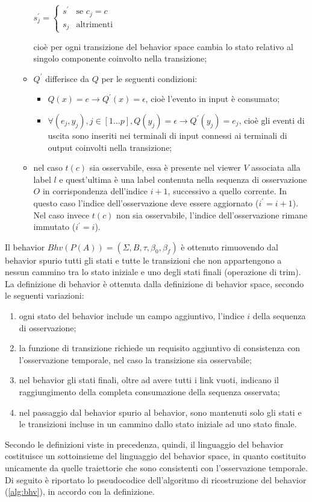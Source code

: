 \begin{defn}
\begin{enumerate}
\begin{itemize}
\begin{center}
$s^\prime_j = \begin{cases} s^\prime & \mbox{se }c_j = c\\ s_j & \mbox{altrimenti} \end{cases}$
\end{center}
cioè per ogni transizione del behavior space cambia lo stato relativo al singolo componente coinvolto nella transizione;
\item $Q^\prime$ differisce da $Q$ per le seguenti condizioni:
\begin{itemize}
\item $Q(x) = e \rightarrow Q^\prime(x) = \epsilon$, cioè l'evento in input è consumato;
\item $\forall(e_j,y_j), j \in [1 \ldots p], Q(y_j) = \epsilon \rightarrow Q^\prime(y_j) = e_j$, cioè gli eventi di uscita sono inseriti nei terminali di input connessi ai terminali di output coinvolti nella transizione; 
\end{itemize}
\item nel caso $t(c)$ sia osservabile, essa è presente nel viewer $V$ associata alla label $l$ e quest'ultima è una label contenuta nella sequenza di osservazione $O$ in corrispondenza dell'indice $i+1$, successivo a quello corrente. In questo caso l'indice dell'osservazione deve essere aggiornato ($i^\prime = i+1$). Nel caso invece $t(c)$ non sia osservabile, l'indice dell'osservazione rimane immutato ($i^\prime = i$).
\end{itemize}
\end{enumerate}

\end{defn}
Il behavior $Bhv(P(A)) = (\Sigma,B,\tau,\beta_0,\beta_f)$ è ottenuto rimuovendo dal behavior spurio tutti gli stati e tutte le transizioni che non appartengono a nessun cammino tra lo stato iniziale e uno degli stati finali (operazione di trim).
La definizione di behavior è ottenuta dalla definizione di behavior space, secondo le seguenti variazioni:
\begin{enumerate}
\item ogni stato del behavior include un campo aggiuntivo, l'indice $i$ della sequenza di osservazione;
\item la funzione di transizione richiede un requisito aggiuntivo di consistenza con l'osservazione temporale, nel caso la transizione sia osservabile;
\item nel behavior gli stati finali, oltre ad avere tutti i link vuoti, indicano il raggiungimento della completa consumazione della sequenza osservata;
\item nel passaggio dal behavior spurio al behavior, sono mantenuti solo gli stati e le transizioni incluse in un cammino dallo stato iniziale ad uno stato finale.
\end{enumerate}
Secondo le definizioni viste in precedenza, quindi, il linguaggio del behavior costituisce un sottoinsieme del linguaggio del behavior space, in quanto costituito unicamente da quelle traiettorie che sono consistenti con l'osservazione temporale.
Di seguito è riportato lo pseudocodice dell'algoritmo di ricostruzione del behavior (\ref{alg:bhv}), in accordo con la definizione.

